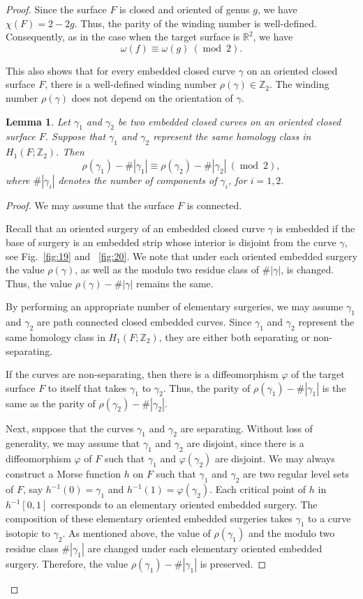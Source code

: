 \documentclass[12pt]{amsart}
\def \R{\mathbb{R}}
\def \Z{\mathbb{Z}}
\def\mod{{\mathop\mathrm{mod}\ }}
\newtheorem{lemma}[theorem]{Lemma}
\theoremstyle{definition}
\begin{document}
{\begin{proof}
 
 
 
 Since the surface $F$ is closed and oriented of genus $g$,  we have $\chi(F)=2-2g$. Thus,  the parity of the winding number is well-defined. Consequently, as in the case when the target surface is $\R^2$, we have
\[
\omega(f) \equiv \omega(g) \  (\mod 2).
\]



This also shows that for every embedded closed curve $\gamma$ on an oriented closed surface $F$, there is a well-defined winding number $\rho(\gamma)\in \Z_2$. The winding number $\rho(\gamma)$ does not depend on the orientation of $\gamma$.  

\begin{lemma}\label{lem:10.1}
Let $\gamma_1$ and $\gamma_2$ be two embedded closed curves on an oriented closed surface $F$. Suppose that $\gamma_1$ and $\gamma_2$ represent the same homology class in $H_1(F; \Z_2)$. Then  
\[
\rho(\gamma_1) - \#|\gamma_1| \equiv \rho(\gamma_2) - \#|\gamma_2| \ (\mod 2),
\]
where $\#|\gamma_i|$ denotes the number of components of $\gamma_i$, for $i=1,2$. 
\end{lemma}
\begin{proof} We may assume that the surface $F$ is connected. 

Recall that an oriented surgery of an embedded closed curve $\gamma$ is embedded if the base of surgery is an embedded strip whose interior is disjoint from the curve $\gamma$, see Fig.~\ref{fig:19} and ~\ref{fig:20}. We note that under each oriented embedded surgery the value $\rho(\gamma)$,  as well as the modulo two residue class of $\#|\gamma|$,  is changed.  Thus, the value  $\rho(\gamma) - \#|\gamma|$ remains the same.

By performing an appropriate number of elementary surgeries, we may assume $\gamma_1$ and $\gamma_2$ are path connected closed embedded curves. Since $\gamma_1$ and $\gamma_2$ represent the same homology class in $H_1(F; \Z_2)$, they are either both separating or non-separating.  
  
  If the curves are non-separating,  then there is a diffeomorphism $\varphi$ of the target surface $F$ to itself that takes $\gamma_1$ to $\gamma_2$.  Thus, the parity of $\rho(\gamma_1) - \#|\gamma_1|$ is the same as the parity of $\rho(\gamma_2) - \#|\gamma_2|$. 
  
  Next, suppose that the curves $\gamma_1$ and $\gamma_2$ are separating.  Without loss of generality, we may assume that $\gamma_1$ and $\gamma_2$ are disjoint, since there is a diffeomorphism $\varphi$ of $F$ such that $\gamma_1$ and $\varphi(\gamma_2)$ are disjoint.     We may always construct a Morse function $h$ on $F$ such that $\gamma_1$ and $\gamma_2$ are two regular level sets of $F$, say $h^{-1}(0)=\gamma_1$ and $h^{-1}(1)=\varphi(\gamma_2)$. Each critical point of $h$ in $h^{-1}[0,1]$ corresponds to an elementary oriented embedded surgery. The composition of these elementary oriented embedded surgeries takes $\gamma_1$ to a curve isotopic to $\gamma_2$.  As mentioned above, the value of  $\rho(\gamma_1)$ and the modulo two residue class $\#|\gamma_1|$ are changed under each elementary oriented embedded surgery.  Therefore,  the value $\rho(\gamma_1) - \#|\gamma_1|$ is preserved.  


\end{proof}
\end{proof}}
\end{document}

